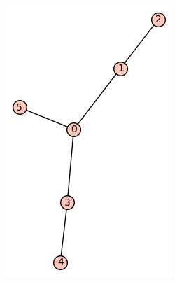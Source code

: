 \documentclass[12pt, a4paper]{article}
\begin{document}
\begin{figure}[h!]
\centering
\includegraphics[width=\linewidth]{t-11}
\end{figure} \\
\end{document}
